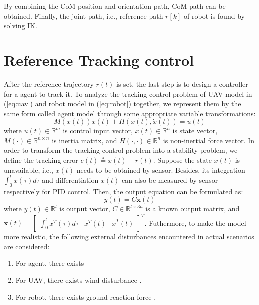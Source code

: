 \documentclass{ieeeaccess}
\begin{document}
By combining the CoM position and orientation path, CoM path can be obtained. Finally, the joint path, i.e., reference path $r[k]$ of robot is found by solving IK.

\section{Reference Tracking control}
After the reference trajectory $r(t)$ is set, the last step is to design a controller for a agent to track it. To analyze the tracking control problem of UAV model in (\ref{eq:uav}) and robot model in (\ref{eq:robot}) together, we represent them by the same form called agent model through some appropriate variable transformations:
\begin{equation} \label{eq:agent} 
    M(x(t))\ddot{x}(t) + H(x(t),\dot{x}(t)) = u(t)
\end{equation}
where $u(t)\in\mathbb{R}^m$ is control input vector, $x(t)\in\mathbb{R}^n$ is state vector, $M(\cdot)\in\mathbb{R}^{n\times n}$ is inertia matrix, and $H(\cdot, \cdot)\in\mathbb{R}^n$ is non-inertial force vector. In order to transform the tracking control problem into a stability problem, we define the tracking error $e(t)\triangleq x(t)-r(t)$.
Suppose the state $x(t)$ is unavailable, i.e., $x(t)$ needs to be obtained by sensor. Besides, its integration $\int_{0}^{t} x(\tau) d\tau$ and differentiation $\dot{x}(t)$ can also be measured by sensor respectively for PID control. Then, the output equation can be formulated as:
\begin{equation} \label{eq:agent output}
    y(t) = C\pmb{x}(t)
\end{equation}
where $y(t)\in\mathbb{R}^l$ is output vector, $C\in\mathbb{R}^{l\times 3n}$ is a known output matrix, and $\pmb{x}(t)=\begin{bmatrix}
    \int_{0}^{t} x^T(\tau) d\tau & x^T(t) & \dot{x}^T(t)
\end{bmatrix}^T$. Futhermore, to make the model more realistic, the following external disturbances encountered in actual scenarios are considered:
\begin{enumerate}
    \item For agent, there exists
    \item For UAV, there exists wind disturbance \cite{9075385}.
    \item For robot, there exists ground reaction force \cite{chen2013human}. 
\end{enumerate}
\end{document}
